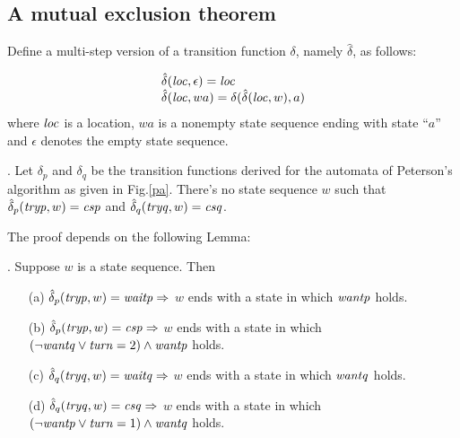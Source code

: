 \documentclass[12pt]{article}
\newcommand{\tid}[1]{\mbox{\tt #1\/}}
\newcommand{\id}[1]{\mbox{\it #1\/}}
\begin{document}
\subsection*{A mutual exclusion theorem}

\noindent Define a multi-step version of a transition function $\delta$,
namely $\hat{\delta}$, as follows:

\[
\begin{array}{l}
\hat{\delta}(\id{loc},\epsilon) = \id{loc} \\
\hat{\delta}(\id{loc}, wa) = \delta(\hat{\delta}(\id{loc},w),a)
\end{array}
\]
where $\id{loc}$ is a location, $wa$ is a nonempty state sequence ending with state ``$a$''
and $\epsilon$ denotes the empty state sequence.



\vspace{1em}
.
Let $\delta_p$ and $\delta_q$ be the transition functions derived for the automata
of Peterson's algorithm as given in Fig.\ref{pa}.
There's no state sequence $w$ such that $\hat{\delta}_p(\id{tryp},w)=\id{csp}$ and
$\hat{\delta}_q(\id{tryq},w)=\id{csq}$.

\vspace{1em}
\noindent The proof depends on the following Lemma:

\vspace{1em}
.
Suppose $w$ is a state sequence.  Then
\begin{enumerate}
\item[(a)] $\hat{\delta}_p(\id{tryp},w)=\id{waitp}\Rightarrow$ $w$ ends with a
state in which $\id{wantp}$ holds.
\item[(b)] $\hat{\delta}_p(\id{tryp},w)=\id{csp}\Rightarrow$ $w$ ends with a
state in which $(\neg\id{wantq}\vee\id{turn}=2)\wedge\id{wantp}$ holds.

\item[(c)] $\hat{\delta}_q(\id{tryq},w)=\id{waitq}\Rightarrow$ $w$ ends with a
state in which $\id{wantq}$ holds.
\item[(d)] $\hat{\delta}_q(\id{tryq},w)=\id{csq}\Rightarrow$ $w$ ends with 
a state in which $(\neg\id{wantp}\vee\id{turn}=1)\wedge\id{wantq}$ holds.
\end{enumerate}
\end{document}
